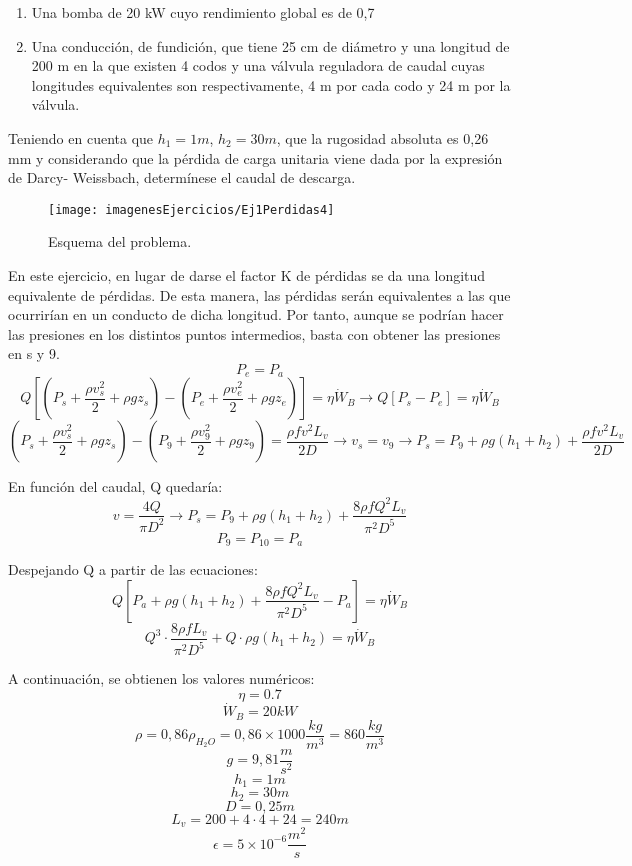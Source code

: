 \begin{enumerate}
	\begin{enumerate}
		\item Una bomba de 20 kW cuyo rendimiento global es de 0,7
		\item Una conducción, de fundición, que tiene 25 cm de diámetro y una longitud de 200
		m en la que existen 4 codos y una válvula reguladora de caudal cuyas longitudes
		equivalentes son respectivamente, 4 m por cada codo y 24 m por la válvula.
	\end{enumerate}
	Teniendo en cuenta que $h_1 = 1 m$, $h_2 = 30 m$, que la rugosidad absoluta es 0,26 mm
	y considerando que la pérdida de carga unitaria viene dada por la expresión de Darcy-
	Weissbach, determínese el caudal de descarga.
	\begin{figure}[H]
		\centering
		\texttt{[image: imagenesEjercicios/Ej1Perdidas4]}
		\caption{Esquema del problema.}
		\label{fig:ej1perdidas4}
	\end{figure}
	\blue
	En este ejercicio, en lugar de darse el factor K de pérdidas se da una longitud equivalente de pérdidas. De esta manera, las pérdidas serán equivalentes a las que ocurrirían en un conducto de dicha longitud. Por tanto, aunque se podrían hacer las presiones en los distintos puntos intermedios, basta con obtener las presiones en s y 9.
	\[P_e=P_a\]
	\[Q\left[\left(P_s+\dfrac{\rho v_s^2}{2}+\rho g z_{s}\right)-\left(P_e+\dfrac{\rho v_e^2}{2}+\rho g z_{e}\right)\right]=\eta \dot{W}_B\rightarrow 
	Q\left[P_s-P_e\right]=\eta \dot{W}_B \]
	\[\left(P_s+\dfrac{\rho v_s^2}{2}+\rho g z_{s}\right)-\left(P_9+\dfrac{\rho v_9^2}{2}+\rho g z_{9}\right)=
	\dfrac{\rho f v^2 L_v }{2D} \rightarrow v_s=v_9 \rightarrow
	P_s=P_9+\rho g (h_1+h_2)+\dfrac{\rho f v^2 L_v }{2D}\]
	
	
	En función del caudal, Q quedaría:
	\[v=\dfrac{4Q }{\pi D^2}\rightarrow P_s=P_9+\rho g (h_1+h_2)+\dfrac{8\rho f Q^2 L_v }{\pi^2 D^5 }\]
	\[P_9=P_{10}=P_a\]	
	
	
	Despejando Q a partir de las ecuaciones:
	\[Q\left[P_a+\rho g (h_1+h_2)+\dfrac{8\rho f Q^2 L_v }{\pi^2 D^5 }-P_a\right]=\eta \dot{W}_B\]
	\[Q^3\cdot \dfrac{8\rho fL_v }{\pi^2 D^5 }+ Q\cdot \rho g (h_1+h_2) =\eta \dot{W}_B\]
	
	
	
	A continuación, se obtienen los valores numéricos:
	\[\eta= 0.7\]
	\[\dot{W}_B=20kW\]
	\[\rho=0,86 \rho_{H_2O}=0,86\times 1000 \dfrac{kg}{m^3}=860 \dfrac{kg}{m^3}\]
	\[g=9,81\dfrac{m}{s^2}\]
	\[h_1=1m\]
	\[h_2=30m\]
	\[D=0,25 m\]
	\[L_v=200+4\cdot4+24=240m\]
	\[\epsilon=5\times 10^{-6} \dfrac{m^2}{s}\]
	

\end{enumerate}

